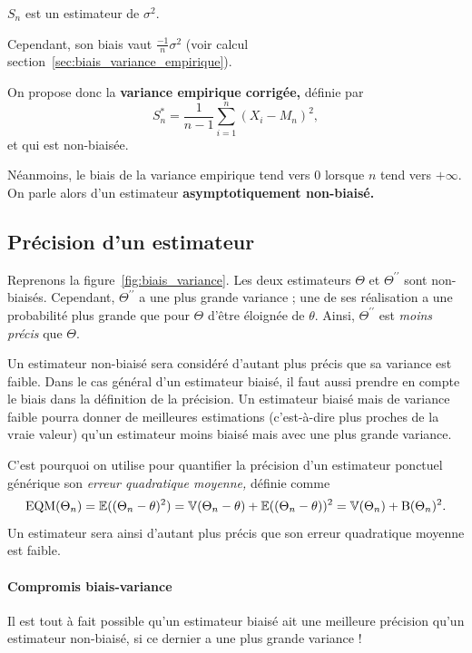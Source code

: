 $S_n$ est un estimateur de $\sigma^2.$

Cependant, son biais vaut $\frac{-1}{n} \sigma^2$  (voir calcul
  section~\ref{sec:biais_variance_empirique}).

On propose donc la \textbf{variance empirique corrigée,} définie par 
\begin{equation}
  S^*_n = \frac1{n-1} \sum_{i=1}^n (X_i - M_n)^2,
  \label{eq:variance_empirique_corrigee}
\end{equation}
et qui est non-biaisée.

Néanmoins, le biais de la variance empirique tend vers 0 lorsque $n$ tend vers
$+\infty$. On parle alors d'un estimateur \textbf{asymptotiquement non-biaisé.}

\subsection{Précision d'un estimateur}
\label{sec:precision_estimateur}

Reprenons la figure~\ref{fig:biais_variance}. Les deux estimateurs $\Theta$ et
$\Theta^{\prime\prime}$ sont non-biaisés. Cependant, $\Theta^{\prime\prime}$ a
une plus grande variance ; une de ses réalisation a une probabilité plus grande
que pour $\Theta$ d'être éloignée de $\theta$. Ainsi, $\Theta^{\prime\prime}$
est \textit{moins précis} que $\Theta.$
  
Un estimateur non-biaisé sera considéré d'autant plus précis que sa variance
est faible.  Dans le cas général d'un estimateur biaisé, il faut aussi prendre
en compte le biais dans la définition de la précision. Un estimateur biaisé
mais de variance faible pourra donner de meilleures estimations (c'est-à-dire
plus proches de la vraie valeur) qu'un estimateur moins biaisé mais avec une
plus grande variance.

C'est pourquoi on utilise pour quantifier la précision d'un estimateur ponctuel
générique son \textit{erreur quadratique moyenne,} définie comme
\begin{equation}
  \text{EQM}(\Theta_n) = \mathbb{E}((\Theta_n - \theta)^2) = \mathbb{V}(\Theta_n - \theta) + \mathbb{E}((\Theta_n - \theta))^2
  = \mathbb{V}(\Theta_n) + \text{B}(\Theta_n)^2.
  \label{eq:eqm}
\end{equation}
Un estimateur sera ainsi d'autant plus précis que son erreur quadratique moyenne est faible.

\paragraph{Compromis biais-variance} Il est tout à fait possible qu'un
estimateur biaisé ait une meilleure précision qu'un estimateur non-biaisé, si
ce dernier a une plus grande variance !

